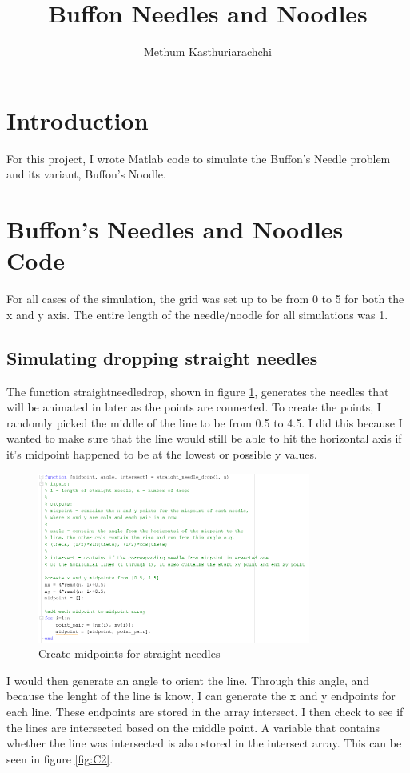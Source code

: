 \documentclass[11pt]{article}
\author{Methum Kasthuriarachchi}
\title{Buffon Needles and Noodles}
\begin{document}
\maketitle

\section{Introduction}
For this project, I wrote Matlab code to simulate the Buffon's Needle problem and its variant, Buffon's Noodle. 

\section{Buffon's Needles and Noodles Code}
For all cases of the simulation, the grid was set up to be from 0 to 5 for both the x and y axis. The entire length of the needle/noodle for all simulations was 1.

\subsection{Simulating dropping straight needles}
The function straight\underline{\hspace{0.2cm}}needle\underline{\hspace{0.2cm}}drop, shown in figure \ref{fig:C1}, generates the needles that will be animated in later as the points are connected. To create the points, I randomly picked the middle of the line to be from 0.5 to 4.5. I did this because I wanted to make sure that the line would still be able to hit the horizontal axis if it's midpoint happened to be at the lowest or possible y values.

\begin{figure}[H]
\includegraphics[width=\textwidth, height = 2.2in]{f1.png}
\caption{Create midpoints for straight needles}
\label{fig:C1}
\end{figure}

 I would then generate an angle to orient the line. Through this angle, and because the lenght of the line is know, I can generate the x and y endpoints for each line. These endpoints are stored in the array intersect. I then check to see if the lines are intersected based on the middle point. A variable that contains whether the line was intersected is also stored in the intersect array. This can be seen in figure \ref{fig:C2}.
\end{document}
